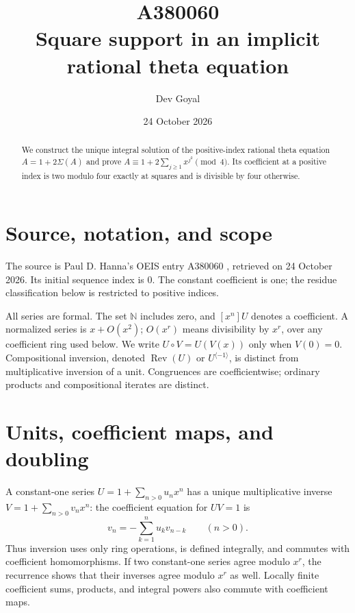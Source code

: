\documentclass[11pt,a4paper]{article}
\title{A380060\\[4pt]\large Square support in an implicit rational theta equation}
\author{Dev Goyal}
\date{24 October 2026}
\theoremstyle{remark}
\newcommand{\N}{\mathbb N}
\newcommand{\Rev}{\operatorname{Rev}}
\newcommand{\rev}{^{\langle-1\rangle}}
\begin{document}
\maketitle
\begin{center}
\end{center}
\begin{abstract}
We construct the unique integral solution of the positive-index rational theta equation $A=1+2\Sigma(A)$ and prove $A\equiv1+2\sum_{j\ge1}x^{j^2}\pmod4$. Its coefficient at a positive index is two modulo four exactly at squares and is divisible by four otherwise.
\end{abstract}

\section{Source, notation, and scope}

The source is Paul D. Hanna's OEIS entry A380060 \cite{oeis060},
retrieved on 24 October 2026. Its initial sequence index is 0.
The constant coefficient is one; the residue classification below
is restricted to positive indices.

All series are formal. The set $\N$ includes zero, and $[x^n]U$ denotes a
coefficient. A normalized series is $x+O(x^2)$; $O(x^r)$ means divisibility
by $x^r$, over any coefficient ring used below. We write $U\circ V=U(V(x))$
only when $V(0)=0$. Compositional inversion, denoted $\Rev(U)$ or $U\rev$,
is distinct from multiplicative inversion of a unit. Congruences are
coefficientwise; ordinary products and compositional iterates are distinct.

\section{Units, coefficient maps, and doubling}

A constant-one series $U=1+\sum_{n>0}u_nx^n$ has a unique multiplicative
inverse $V=1+\sum_{n>0}v_nx^n$: the coefficient equation for $UV=1$ is
\[
 v_n=-\sum_{k=1}^n u_kv_{n-k}\qquad(n>0).
\]
Thus inversion uses only ring operations, is defined integrally, and commutes
with coefficient homomorphisms. If two constant-one series agree modulo
$x^r$, the recurrence shows that their inverses agree modulo $x^r$ as well.
Locally finite coefficient sums, products, and integral powers also commute
with coefficient maps.
\end{document}
